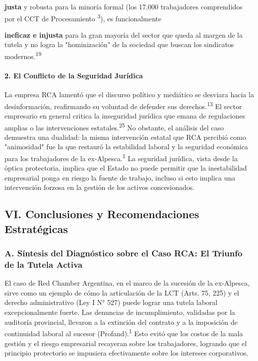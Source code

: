 \documentclass[]{article}
\begin{document}
\textbf{justa} y robusta para la minoría formal (los 17.000 trabajadores
comprendidos por el CCT de Procesamiento \textsuperscript{3}), es
funcionalmente

\textbf{ineficaz e injusta} para la gran mayoría del sector que queda al
margen de la tutela y no logra la "hominización" de la sociedad que
buscan los sindicatos modernos.\textsuperscript{19}

\hypertarget{el-conflicto-de-la-seguridad-juruxeddica}{%
\paragraph{2. El Conflicto de la Seguridad
Jurídica}\label{el-conflicto-de-la-seguridad-juruxeddica}}

La empresa RCA lamentó que el discurso político y mediático se desviara
hacia la desinformación, reafirmando su voluntad de defender sus
derechos.\textsuperscript{13} El sector empresario en general critica la
inseguridad jurídica que emana de regulaciones amplias o las
intervenciones estatales.\textsuperscript{25} No obstante, el análisis
del caso demuestra una dualidad: la misma intervención estatal que RCA
percibió como "animosidad" fue la que restauró la estabilidad laboral y
la seguridad económica para los trabajadores de la
ex-Alpesca.\textsuperscript{1} La seguridad jurídica, vista desde la
óptica protectoria, implica que el Estado no puede permitir que la
inestabilidad empresarial ponga en riesgo la fuente de trabajo, incluso
si esto implica una intervención forzosa en la gestión de los activos
concesionados.

\hypertarget{vi.-conclusiones-y-recomendaciones-estratuxe9gicas}{%
\subsection{VI. Conclusiones y Recomendaciones
Estratégicas}\label{vi.-conclusiones-y-recomendaciones-estratuxe9gicas}}

\hypertarget{a.-suxedntesis-del-diagnuxf3stico-sobre-el-caso-rca-el-triunfo-de-la-tutela-activa}{%
\subsubsection{A. Síntesis del Diagnóstico sobre el Caso RCA: El Triunfo
de la Tutela
Activa}\label{a.-suxedntesis-del-diagnuxf3stico-sobre-el-caso-rca-el-triunfo-de-la-tutela-activa}}

El caso de Red Chamber Argentina, en el marco de la sucesión de la
ex-Alpesca, sirve como un ejemplo de cómo la articulación de la LCT
(Arts. 75, 225) y el derecho administrativo (Ley I N° 527) puede lograr
una tutela laboral excepcionalmente fuerte. Las denuncias de
incumplimiento, validadas por la auditoría provincial, llevaron a la
extinción del contrato y a la imposición de continuidad laboral al
sucesor (Profand).\textsuperscript{1} Esto evitó que los costos de la
mala gestión y el riesgo empresarial recayeran sobre los trabajadores,
logrando que el principio protectorio se impusiera efectivamente sobre
los intereses corporativos.
\end{document}
